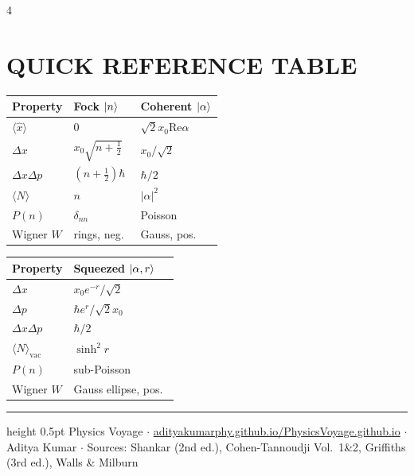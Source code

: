 \documentclass[10pt,landscape,a4paper]{article}
\newcommand{\xop}{\hat{x}}
\newcommand{\xzero}{x_0}
\newcommand{\half}{\tfrac{1}{2}}
\begin{document}
\begin{multicols}{4}
\section{QUICK REFERENCE TABLE}

\begin{tabular}{@{}p{2.1cm}p{1.5cm}p{1.5cm}@{}}
\toprule
\textbf{Property} & \textbf{Fock $\ket{n}$} & \textbf{Coherent $\ket{\alpha}$}\\
\midrule
$\langle\xop\rangle$ & $0$ & $\sqrt{2}\xzero\text{Re}\alpha$\\
$\Delta x$ & $\xzero\sqrt{n+\half}$ & $\xzero/\sqrt{2}$\\
$\Delta x\Delta p$ & $(n+\half)\hbar$ & $\hbar/2$\\
$\langle N\rangle$ & $n$ & $|\alpha|^2$\\
$P(n)$ & $\delta_{nn}$ & Poisson\\
Wigner $W$ & rings, neg.\ & Gauss, pos.\ \\
\bottomrule
\end{tabular}

\vspace{4pt}
\begin{tabular}{@{}p{2.1cm}p{2.5cm}@{}}
\toprule
\textbf{Property} & \textbf{Squeezed $\ket{\alpha,r}$}\\
\midrule
$\Delta x$ & $\xzero e^{-r}/\sqrt{2}$\\
$\Delta p$ & $\hbar e^{r}/\sqrt{2}\xzero$\\
$\Delta x\Delta p$ & $\hbar/2$\\
$\langle N\rangle_{\text{vac}}$ & $\sinh^2 r$\\
$P(n)$ & sub-Poisson\\
Wigner $W$ & Gauss ellipse, pos.\ \\
\bottomrule
\end{tabular}

\end{multicols}

\vspace{2pt}
\hrule height 0.5pt
\vspace{2pt}
{\centering\footnotesize\color{gray!70!black}
Physics Voyage $\cdot$ \href{https://adityakumarphy.github.io/PhysicsVoyage.github.io/}{adityakumarphy.github.io/PhysicsVoyage.github.io} $\cdot$ 
Aditya Kumar $\cdot$ Sources: Shankar (2nd ed.), Cohen-Tannoudji Vol.~1\&2, Griffiths (3rd ed.), Walls \& Milburn\\
}
\end{document}
